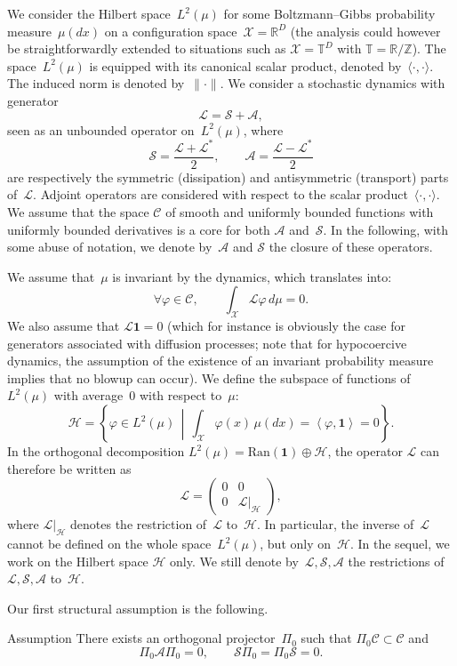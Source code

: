 \documentclass[AHL,Unicode,longabstracts,MathTools,published]{cedram}
\newcommand{\Ran}{\mathrm{Ran}}
\newcommand{\cL}{\mathcal{L}}
\newcommand{\cLs}{\mathcal{S}}
\newcommand{\cLa}{\mathcal{A}}
\newcommand{\cX}{\mathcal{X}}
\newcommand{\cH}{\mathcal{H}}
\newcommand{\R}{\mathbb{R}}
\newcommand{\bbZ}{\mathbb{Z}}
\newcommand{\bbT}{\mathbb{T}}
\newcommand{\bfun}{\mathbf{1}}
\newcommand{\scrC}{\mathscr{C}}
\let\oldforall\forall
\renewcommand*{\forall}{\mathrel{\oldforall}}
\begin{document}
We consider the Hilbert space~$L^2(\mu)$ for some Boltzmann--Gibbs probability measure~$\mu(dx)$ on a configuration space~$\cX = \R^D$ (the analysis could however be straightforwardly extended to situations such as $\cX = \bbT^D$ with $\bbT = \R / \bbZ$). The space~$L^2(\mu)$ is equipped with its canonical scalar product, denoted by~$\langle\cdot,\cdot\rangle$. The induced norm is denoted by~$\|\cdot\|$. We consider a stochastic dynamics with generator
\[
\cL = \cLs + \cLa,
\]
seen as an unbounded operator on~$L^2(\mu)$, where
\[
\cLs = \frac{\cL+\cL^*}{2}, \qquad \cLa = \frac{\cL-\cL^*}{2}
\]
are respectively the symmetric (dissipation) and antisymmetric (transport) parts of~$\cL$. Adjoint operators are considered with respect to the scalar product~$\langle\cdot,\cdot\rangle$. We assume that the space $\scrC$ of smooth and uniformly bounded functions with uniformly bounded derivatives is a core for both $\cLa$ and~$\cLs$. In the following, with some abuse of notation, we denote by~$\cLa$ and $\cLs$ the closure of these operators.

We assume that~$\mu$ is invariant by the dynamics, which translates into:
\[
\forall \varphi \in \scrC, \qquad \int_\cX \cL \varphi \, d\mu = 0.
\]
We also assume that $\cL\bfun = 0$ (which for instance is obviously the case for generators associated with diffusion processes; note that for hypocoercive dynamics, the assumption of the existence of an invariant probability measure implies that no blowup can occur). We define the subspace of functions of~$L^2(\mu)$ with average~0 with respect to~$\mu$:
\[
\cH = \left\{ \varphi \in L^2(\mu) \, \middle| \, \int_\cX \varphi(x) \, \mu(dx) = \left\langle \varphi,\bfun\right\rangle = 0 \right\}.
\]
In the orthogonal decomposition $L^2(\mu) = \Ran(\bfun) \oplus \cH$, the operator $\cL$ can therefore be written as
\[
\cL =
\begin{pmatrix} 0 & 0 \\
0 & \cL|_\cH
\end{pmatrix},
\]
where $\cL|_\cH$ denotes the restriction of~$\cL$ to~$\cH$. In particular, the inverse of~$\cL$ cannot be defined on the whole space~$L^2(\mu)$, but only on~$\cH$. In the sequel, we work on the Hilbert space $\cH$ only. We still denote by~$\cL,\cLs,\cLa$ the restrictions of~$\cL,\cLs,\cLa$ to~$\cH$.

Our first structural assumption is the following.

\begin{enonce}
{Assumption}\label{ass:structural_Pi}
There exists an orthogonal projector~$\Pi_{0}$ such that $\Pi_{0}
\scrC \subset \scrC$ and
\begin{equation}\label{eq:conditions_L_Pi}
\Pi_{0} \cLa \Pi_{0} = 0, \qquad \cLs \Pi_{0} = \Pi_{0} \cLs = 0.
\end{equation}
\end{enonce}
\end{document}

